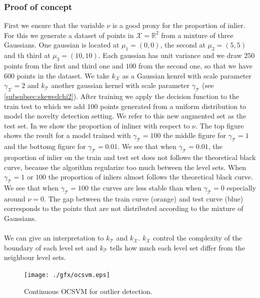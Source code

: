 \subsubsection{Proof of concept}
First we ensure that the variable $\nu$ is a good proxy for the proportion of
inlier. For this we generate a dataset of points in $\mathcal{X}=\mathbb{R}^2$
from a mixture of three Gaussians. One gaussian is located at $\mu_1=(0, 0)$,
the second at $\mu_2=(5, 5)$ and th third at $\mu_3 = (10, 10)$. Each gaussian
has unit variance and we draw $250$ points from the first and third one and
$100$ from the second one, so that we have $600$ points in the dataset.  We
take $k_{\mathcal{X}}$ as a Gaussian kenrel with scale parameter
$\gamma_{\mathcal{X}}=2$ and $k_{\mathcal{T}}$ another gaussian kernel with
scale parameter $\gamma_{\mathcal{T}}$ (see \cref{subsubsec:skewedchi2}). After
training we apply the decision function to the train test to which we add $100$
points generated from a uniform distribution to model the novelty detection
setting. We refer to this new augmented set as the test set.
In  we show the proportion of inliner with respect
to $\nu$. The top figure shows the result for a model trained with
$\gamma_{\mathcal{T}}=100$ the middle figure for $\gamma_{\mathcal{T}}=1$ and
the bottomg figure for $\gamma_{\mathcal{T}}=0.01$. We see that when
$\gamma_{\mathcal{T}}=0.01$, the proportion of inlier on the train and test set
does not follows the theoretical black curve, because the algorithm regularize
too much between the level sets. When $\gamma_{\mathcal{T}}=1$ or $100$ the
proportion of inliers almost follows the theoretical black curve. We see that
when $\gamma_{\mathcal{T}}=100$ the curves are less stable than when
$\gamma_{\mathcal{T}}=0$ especially around $\nu=0$. The gap between the train
curve (orange) and test curve (blue) corresponds to the  points that
are not distributed according to the mixture of Gaussians.

\paragraph{}
We can give an interpretation to $k_{\mathcal{T}}$ and $k_{\mathcal{X}}$.
$k_{\mathcal{X}}$ control the complexity of the boundary of each level set and
$k_{\mathcal{T}}$ tells how much each level set differ from the neighbour level
sets.
\begin{figure}
    {\centering\texttt{[image: ./gfx/ocsvm.eps]}}
    \caption[Continuous OCSVM for outlier detection]{Continuous OCSVM for
    outlier detection. \label{fig:ocsvm_outlier}}
\end{figure}
